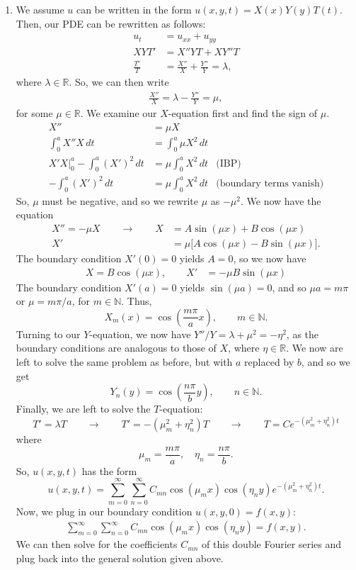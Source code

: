 \documentclass[10pt,letterpaper]{report}
\newcommand{\R}{\mathbb{R}}
\newcommand{\N}{\mathbb{N}}
\newcommand{\so}{\qquad \rightarrow \qquad}
\begin{document}
\begin{enumerate}
\begin{enumerate}
\item We assume $u$ can be written in the form $u(x, y, t) = X(x)Y(y)T(t)$. Then, our PDE can be rewritten as follows:
\begin{align*}
    u_t &= u_{xx} + u_{yy} \\
    XYT' &= X''YT + XY''T \\
    \frac{T'}{T} &= \frac{X''}{X} + \frac{Y''}{Y} = \lambda,
\end{align*}
where $\lambda \in \R$. So, we can then write
\begin{align*}
    \frac{X''}{X} = \lambda - \frac{Y''}{Y} = \mu,
\end{align*}
for some $\mu \in \R$. We examine our $X$-equation first and find the sign of $\mu$.
\begin{align*}
    X'' &= \mu X \\
    \int_0^a X'' X\,dt &= \int_0^a \mu X^2\,dt \\
    X'X\big\vert_0^a - \int_0^a (X')^2\,dt &= \mu \int_0^a X^2\,dt &\textrm{(IBP)}
    \\
    - \int_0^a (X')^2\,dt &= \mu \int_0^a X^2\,dt &\textrm{(boundary terms vanish)}
\end{align*}
So, $\mu$ must be negative, and so we rewrite $\mu$ as $-\mu^2$. We now have the equation
\begin{align*}
    X'' = -\mu X \so X &= A\sin(\mu x) + B\cos(\mu x) \\
    X' &= \mu\big[A\cos(\mu x) - B \sin(\mu x)\big].
\end{align*}
The boundary condition $X'(0) = 0$ yields $A = 0$, so we now have
\begin{align*}
    X = B\cos(\mu x), \qquad X' &= -\mu B \sin(\mu x)
\end{align*}
The boundary condition $X'(a) = 0$ yields $\sin(\mu a) = 0$, and so $\mu a = m\pi$ or $\mu = m\pi/a$, for $m \in \N$. Thus,
\[
X_m(x) = \cos\left(\frac{m \pi }{a} x\right), \qquad m \in \N.
\]
Turning to our $Y$-equation, we now have $Y''/Y = \lambda + \mu^2 = -\eta^2$, as the boundary conditions are analogous to those of $X$, where $\eta \in \R$. We now are left to solve the same problem as before, but with $a$ replaced by $b$, and so we get
\[
Y_n(y) = \cos\left(\frac{n \pi }{b} y\right), \qquad n \in \N.
\]
Finally, we are left to solve the $T$-equation:
\[
T' = \lambda T \so T' = -\left(\mu_m^2 + \eta_n^2\right)T \so T = C e^{-\left(\mu_m^2 + \eta_n^2\right)t}
\]
where
\[
\mu_m = \frac{m\pi}{a}, \quad \eta_n = \frac{n\pi}{b}.
\]
So, $u(x, y, t)$ has the form
\[
u(x, y, t) = \sum_{m = 0}^\infty\sum_{n = 0}^\infty C_{mn} \cos\left(\mu_m x\right) \cos\left(\eta_n y\right)e^{-\left(\mu_m^2 + \eta_n^2\right)t}.
\]
Now, we plug in our boundary condition $u(x, y, 0) = f(x, y):$
\begin{align*}
    \sum_{m = 0}^\infty\sum_{n = 0}^\infty C_{mn} \cos(\mu_m x)\cos(\eta_n y) = f(x, y).
\end{align*}
We can then solve for the coefficients $C_{mn}$ of this double Fourier series and plug back into the general solution given above.


\end{enumerate}
\end{enumerate}
\end{document}
